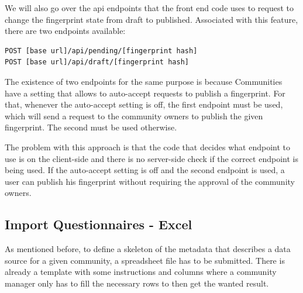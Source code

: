 We will also go over the \gls{api} endpoints that the front end code uses to request to change the fingerprint state from draft to published.
Associated with this feature, there are two endpoints available:

\begin{verbatim}
POST [base url]/api/pending/[fingerprint hash]
POST [base url]/api/draft/[fingerprint hash]
\end{verbatim}

The existence of two endpoints for the same purpose is because Communities have a setting that allows to auto-accept requests to publish a fingerprint.
For that, whenever the auto-accept setting is off, the first endpoint must be used, which will send a request to the community owners to publish the given fingerprint.
The second must be used otherwise.

The problem with this approach is that the code that decides what endpoint to use is on the client-side and there is no server-side check if the correct endpoint is being used.
If the auto-accept setting is off and the second endpoint is used, a user can publish his fingerprint without requiring the approval of the community owners.

\subsection{Import Questionnaires - Excel}
\label{subsection:excel}

As mentioned before, to define a skeleton of the metadata that describes a data source for a given community, a spreadsheet file has to be submitted.
There is already a template with some instructions and columns where a community manager only has to fill the necessary rows to then get the wanted result.

